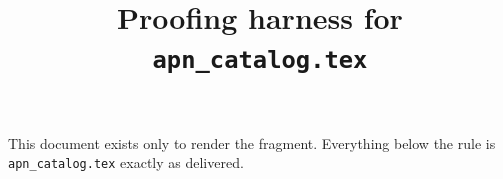 \documentclass[10pt,twocolumn]{article}
\title{Proofing harness for \texttt{apn\_catalog.tex}}
\author{}
\date{}
\begin{document}
\maketitle

\noindent
This document exists only to render the fragment.  Everything below the rule is
\verb|apn_catalog.tex| exactly as delivered.

\hrulefill



\onecolumn


\end{document}
